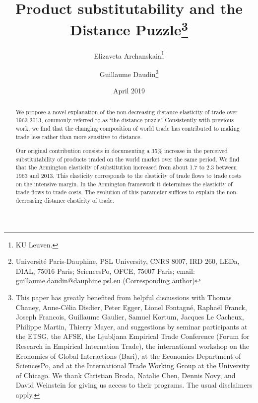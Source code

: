 \documentclass[12pt,twoside,a4paper,notitlepage]{article}
\begin{document}
\linespread{1}
\author{Elizaveta Archanskaia\thanks{KU Leuven.}\and Guillaume Daudin\thanks{Université Paris-Dauphine, PSL University, CNRS 8007, IRD 260, LEDa, DIAL, 75016 Paris; SciencesPo, OFCE, 75007 Paris; email: guillaume.daudin@dauphine.psl.eu (Corresponding author)
}}

\title{Product substitutability and the Distance Puzzle\thanks{This paper has greatly benefited from helpful discussions with Thomas Chaney, Anne-C\'elia Disdier, Peter Egger, Lionel Fontagn\'e, Raphaël Franck, Joseph Francois, Guillaume Gaulier, Samuel Kortum, Jacques Le Cacheux, Philippe Martin, Thierry Mayer, and suggestions by seminar participants at the ETSG, the AFSE, the Ljubljana Empirical Trade Conference (Forum for Research in Empirical Internation Trade), the international workshop on the Economics of Global Interactions (Bari), at the Economics Department of SciencesPo, and at the International Trade Working Group at the University of Chicago.
We thank Christian Broda, Natalie Chen, Dennis Novy, and David Weinstein for giving us access to their programs.
The usual disclaimers apply.}}
\date{April 2019
\\
}

\maketitle
\begin{abstract}
We propose a novel explanation of the non-decreasing distance elasticity of trade over 1963-2013, commonly referred to as `the distance puzzle'.
Consistently with previous work, we find that the changing composition of world trade has contributed to making trade less rather than more sensitive to distance.

Our original contribution consists in documenting a 35\% increase in the perceived substitutability of products traded on the world market over the same period.
We find that the Armington elasticity of substitution increased from about 1.7 to 2.3 between 1963 and 2013.
This elasticity corresponds to the elasticity of trade flows to trade costs on the intensive margin.
In the Armington framework it determines the elasticity of trade flows to trade costs.
The evolution of this parameter suffices to explain the non-decreasing distance elasticity of trade.

\end{abstract}
\end{document}
